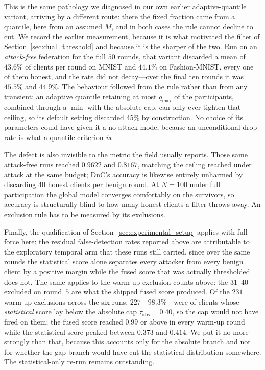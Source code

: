 \documentclass[journal]{IEEEtran}
\begin{document}
This is the same pathology we diagnosed in our own earlier adaptive-quantile variant, arriving by a different route: there the fixed fraction came from a quantile, here from an assumed $M$, and in both cases the rule cannot decline to cut. We record the earlier measurement, because it is what motivated the filter of Section~\ref{sec:dual_threshold} and because it is the sharper of the two. Run on an \emph{attack-free} federation for the full $50$ rounds, that variant discarded a mean of $43.6\%$ of clients per round on MNIST and $44.1\%$ on Fashion-MNIST, every one of them honest, and the rate did not decay---over the final ten rounds it was $45.5\%$ and $44.9\%$. The behaviour followed from the rule rather than from any transient: an adaptive quantile retaining at most $q_{\max}$ of the participants, combined through a $\min$ with the absolute cap, can only ever tighten that ceiling, so its default setting discarded $45\%$ by construction. No choice of its parameters could have given it a no-attack mode, because an unconditional drop rate is what a quantile criterion \emph{is}.

The defect is also invisible to the metric the field usually reports. Those same attack-free runs reached $0.9622$ and $0.8167$, matching the ceiling reached under attack at the same budget; DnC's accuracy is likewise entirely unharmed by discarding $40$ honest clients per benign round. At $N = 100$ under full participation the global model converges comfortably on the survivors, so accuracy is structurally blind to how many honest clients a filter throws away. An exclusion rule has to be measured by its exclusions.

Finally, the qualification of Section~\ref{sec:experimental_setup} applies with full force here: the residual false-detection rates reported above are attributable to the exploratory temporal arm that these runs still carried, since over the same rounds the statistical score alone separates every attacker from every benign client by a positive margin while the fused score that was actually thresholded does not. The same applies to the warm-up exclusion counts above: the $31$--$40$ excluded on round~$5$ are what the shipped fused score produced. Of the $231$ warm-up exclusions across the six runs, $227$---$98.3\%$---were of clients whose \emph{statistical} score lay below the absolute cap $\tau_{\mathrm{abs}} = 0.40$, so the cap would not have fired on them; the fused score reached $0.99$ or above in every warm-up round while the statistical score peaked between $0.373$ and $0.414$. We put it no more strongly than that, because this accounts only for the absolute branch and not for whether the gap branch would have cut the statistical distribution somewhere. The statistical-only re-run remains outstanding.
\end{document}
